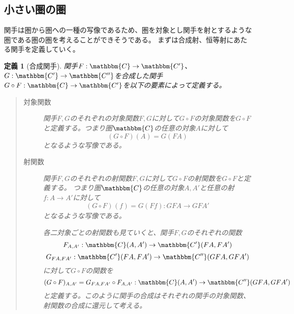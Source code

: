 \documentclass[dvipdfmx]{jsarticle}
\newcommand{\cat}[1]{\mathbbm{#1}}
\newcommand{\arrow}{\rightarrow}
\newcommand{\functor}[3]{#1:\cat{#2}\arrow \cat{#3}}
\newcommand{\mor}[3]{#1:#2\arrow #3}
\newcommand{\arset}[3]{\cat{#1}(#2,#3)}
\newtheorem{define}{定義}[section]
\numberwithin{proof}{subsection}
\numberwithin{prop}{subsection}
\numberwithin{define}{subsection}
\begin{document}
	\subsection{小さい圏の圏}
	関手は圏から圏への一種の写像であるため、圏を対象とし関手を射とするような圏である圏の圏を考えることができそうである。
	まずは合成射、恒等射にあたる関手を定義していく。
	\begin{define}[合成関手]
		関手$\functor{F}{C}{C'}$、$\functor{G}{C'}{C''}$を合成した関手$\functor{G\circ F}{C}{C'}$を以下の要素によって定義する。
		\begin{quote}
			\begin{description}
			\item[対象関数]関手$F,G$のそれぞれの対象関数$F,G$に対して$G\circ F$の対象関数を$G\circ F$と定義する。つまり圏$\cat{C}$の任意の対象$A$に対して\[(G\circ F)(A)=G(FA)\]となるような写像である。
			\item[射関数]関手$F,G$のそれぞれの射関数$F,G$に対して$G\circ F$の射関数を$G\circ F$と定義する。
			つまり圏$\cat{C}$の任意の対象$A,A'$と任意の射$\mor{f}{A}{A'}$に対して\[\mor{(G\circ F)_{}(f)=G(Ff)}{GFA}{GF{A'}}\]となるような写像である。

			各二対象ごとの射関数も見ていくと、関手$F,G$のそれぞれの関数\[\mor{F_{A,A'}}{\arset{C}{A}{A'}}{\arset{C'}{FA}{FA'}}\]\[\mor{G_{FA,FA'}}{\arset{C'}{FA}{FA'}}{\arset{C''}{GFA}{GFA'}}\]に対して$G\circ F$の関数を\[(G\circ F)_{A,A'}=\mor{G_{FA,FA'}\circ F_{A,A'}}{\arset{C}{A}{A'}}{\arset{C''}{GFA}{GFA'}}\]と定義する。このように関手の合成はそれぞれの関手の対象関数、射関数の合成に還元して考える。

			\begin{center}
\end{center}
\end{description}
\end{quote}
\end{define}
\end{document}
